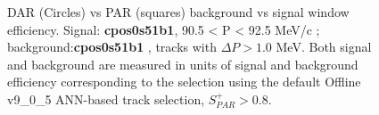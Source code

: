 \begin{figure}[H]
  \hspace{-0.6in}
  \caption{
    \label{fig:mumep_trq_ann} 
    DAR (Circles) vs PAR (squares) background vs signal window efficiency.
    Signal: {\bf cpos0s51b1}, 90.5 < P < 92.5 MeV/c ;
    background:{\bf cpos0s51b1} , tracks with $\Delta{P} > 1.0$ MeV.
    Both signal and background are measured in units of signal and background efficiency
    corresponding to the selection using the default Offline v9\_0\_5 ANN-based track
    selection, $S_{PAR}^+ > 0.8$.
  }
\end{figure}

